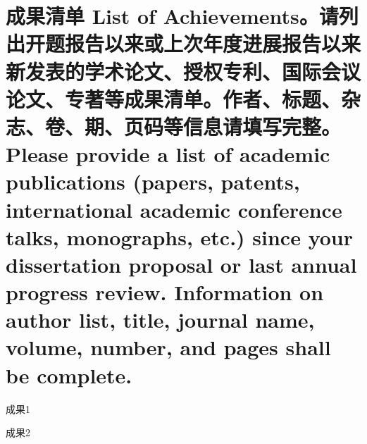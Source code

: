 \documentclass[a4paper,zihao=-4,AutoFakeBold]{ctexart}
\begin{document}
\section{成果清单 List of Achievements。\mdseries 请列出开题报告以来或上次年度进展报告以来新发表的学术论文、授权专利、国际会议论文、专著等成果清单。作者、标题、杂志、卷、期、页码等信息请填写完整。Please provide a list of academic publications (papers, patents, international academic conference talks, monographs, etc.) since your dissertation proposal or last annual progress review. Information on author list, title, journal name, volume, number, and pages shall be complete.}

\begin{enumerate}[label={[\arabic*]}]
  \item 成果1
  \item 成果2
\end{enumerate}


\makesignature
\end{document}
